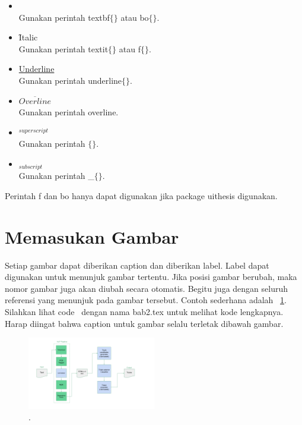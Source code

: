 \begin{itemize}
	\item {} \\
		Gunakan perintah \bslash textbf$\lbrace\rbrace$ atau 
		\bslash bo$\lbrace\rbrace$. 
	\item \f{Italic} \\
		Gunakan perintah \bslash textit$\lbrace\rbrace$ atau 
		\bslash f$\lbrace\rbrace$. 
	\item \underline{Underline} \\
		Gunakan perintah \bslash underline$\lbrace\rbrace$.
	\item $\overline{Overline}$ \\
		Gunakan perintah \bslash overline. 
	\item $^{superscript}$ \\
		Gunakan perintah \bslash $\lbrace\rbrace$. 
	\item $_{subscript}$ \\
		Gunakan perintah \bslash \_$\lbrace\rbrace$. 
\end{itemize}

Perintah \bslash f dan \bslash bo hanya dapat digunakan jika package 
uithesis digunakan. 


\section{Memasukan Gambar}
Setiap gambar dapat diberikan caption dan diberikan label. Label dapat 
digunakan untuk menunjuk gambar tertentu. 
Jika posisi gambar berubah, maka nomor gambar juga akan diubah secara 
otomatis. 
Begitu juga dengan seluruh referensi yang menunjuk pada gambar tersebut. 
Contoh sederhana adalah \pic~\ref{fig:testGambar}. 
Silahkan lihat code \latex~dengan nama bab2.tex untuk melihat kode lengkapnya. 
Harap diingat bahwa caption untuk gambar selalu terletak dibawah gambar. 

\begin{figure}
	\centering
	\includegraphics[width=0.50\textwidth]
		{../images/program_flowchart.png}
	\caption{\license.}
	\label{fig:testGambar}
\end{figure}


